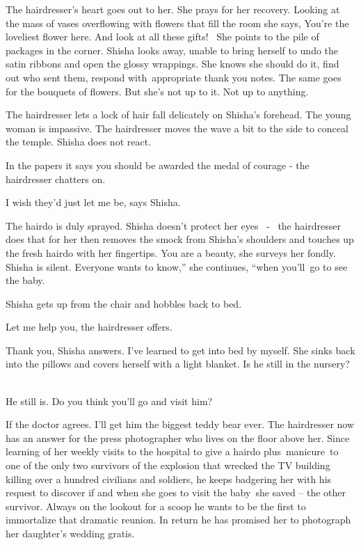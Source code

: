 \documentclass[letterpaper]{article}
\begin{document}
The hairdresser's heart goes out to her. She prays for her recovery. Looking at the mass of vases overflowing with
flowers that fill the room she says, {\textquotedbl}You're the loveliest flower here. And look at all these
gifts!{\textquotedbl} \ She points to the pile of packages in the corner. Shisha looks away, unable to bring herself to
undo the satin ribbons and open the glossy wrappings. She knows she should do it, find out who sent them, respond
with~appropriate thank you notes. The same goes for the bouquets of flowers. But she's not up to it. Not up to
anything. 

The hairdresser lets a lock of hair fall delicately on Shisha's forehead. The young woman is impassive. The hairdresser
moves the wave a bit to the side to conceal the temple. Shisha does not react.{
}\ 

{\textquotedbl}In the papers it says you should be awarded the medal of courage -{\textquotedbl} the hairdresser
chatters on. 

{\textquotedbl}I wish they'd just let me be,{\textquotedbl} says Shisha{.}

The hairdo is duly sprayed. Shisha doesn't protect{ }her eyes
\ {{}- }\ the hairdresser does that for her then removes the smock from
Shisha's shoulders and touches up the fresh hairdo with her fingertips. {\textquotedbl}You are a beauty,{\textquotedbl}
she surveys her fondly. Shisha is silent. {\textquotedbl}Everyone wants to know,'' she continues, ``when you'll~go to
see the baby.{\textquotedbl} 

Shisha gets up from the chair and hobbles back to bed. 

{\textquotedbl}Let me help you,{\textquotedbl} the hairdresser offers.

{\textquotedbl}Thank you,{\textquotedbl} Shisha answers. {\textquotedbl}I've learned to get into bed by
myself.{\textquotedbl} She sinks back into the pillows and covers herself with a light blanket. {\textquotedbl}Is he
still in the nursery?{\textquotedbl} \ 

{\textquotedbl}He still is. Do you think you'll go and visit him?{\textquotedbl} 

{\textquotedbl}If the doctor agrees. I'll get him the biggest teddy bear ever.{\textquotedbl} The hairdresser now has an
answer for the press photographer who lives on the floor above her. Since learning of her weekly visits to the hospital
to give a hairdo plus~manicure~to one of the only two survivors of the explosion that wrecked the TV building killing
over a hundred civilians and soldiers, he keeps badgering her with his request to discover if and when she goes to
visit the baby~she saved -- the other survivor. Always on the lookout for a scoop he wants to be the first to
immortalize that dramatic reunion. In return he has promised her to photograph her daughter's wedding gratis.~ 
\end{document}
